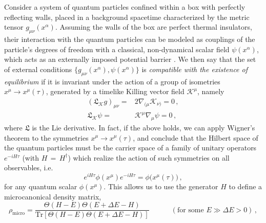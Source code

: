 \documentclass[a4paper, amsfonts, amssymb, amsmath, reprint, showkeys, nofootinbib, twoside, onecolumn,notitlepage]{revtex4-1}
\newcommand{\spc}{\quad \quad \quad}
\newcommand{\K}{{\mathcal{K}}}
\theoremstyle{definition}
\theoremstyle{theorem}
\begin{document}
Consider a system of quantum particles confined within a box with perfectly reflecting walls, placed in a background spacetime characterized by the metric tensor $g_{\mu \nu}(x^\alpha)$. Assuming the walls of the box are perfect thermal insulators, their interaction with the quantum particles can be modeled as couplings of the particle's degrees of freedom with a classical, non-dynamical scalar field $\psi(x^\alpha)$, which acts as an externally imposed potential barrier \cite[\S 11]{landau5}. We then say that the set of external conditions $\{g_{\mu \nu}(x^\alpha),\psi(x^\alpha)\}$ is \textit{compatible with the existence of equilibrium} if it is invariant under the action of a group of isometries $x^\mu \rightarrow x^\mu (\tau)$, generated by a timelike Killing vector field $\K^\mu$, namely
\begin{equation}\label{killingone}
\begin{split}
(\mathfrak{L}_\K g)_{\mu \nu}={}& 2\nabla_{(\mu}\K_{\nu)}=0 \, , \\
\mathfrak{L}_\K \psi={}& \K^\mu \nabla_\mu \psi=0 \, ,
\end{split}
\end{equation}
where $\mathfrak{L}$ is the Lie derivative. In fact, if the above holds, we can apply Wigner's theorem \cite[\S 2.2]{weinbergQFT_1995} to the symmetries $x^\mu \rightarrow x^\mu (\tau)$, and conclude that the Hilbert space of the quantum particles must be the carrier space of a family of unitary operators $e^{-iH\tau}$ (with $H\,{=}\, H^\dagger$) which realize the action of such symmetries on all observables, i.e.
\begin{equation}\label{oioioi}
e^{iH\tau}\phi(x^\mu)e^{-iH\tau}=\phi\big(x^\mu (\tau)\big)\, , 
\end{equation}
for any quantum scalar $\phi(x^\mu)$. This allows us to use the generator $H$ to define a microcanonical density matrix,
\begin{equation}\label{grabbino}
\rho_\text{micro} = \dfrac{\Theta(H{-}E)\Theta(E{+}\Delta E{-}H)}{\text{Tr}[\Theta(H{-}E)\Theta(E{+}\Delta E{-}H)]} \spc (\text{for some }E\gg \Delta E>0) \, , 
\end{equation}
\end{document}
